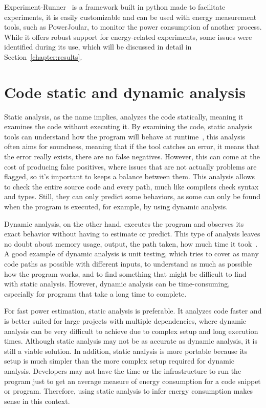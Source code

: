 Experiment-Runner~\cite{S2_Group_Experiment_Runner} is a framework built in python made to facilitate experiments, it is easily customizable and can be used with energy measurement tools, such as PowerJoular, to monitor the power consumption of another process. While it offers robust support for energy-related experiments, some issues were identified during its use, which will be discussed in detail in Section~\ref{chapter:results}.


\section{Code static and dynamic analysis} \label{sec:background_static_dynamic_analysis}

Static analysis, as the name implies, analyzes the code statically, meaning it examines the code without executing it. By examining the code, static analysis tools can understand how the program will behave at runtime~\cite{ernst2003static}, this analysis often aims for soundness, meaning that if the tool catches an error, it means that the error really exists, there are no false negatives. However, this can come at the cost of producing false positives, where issues that are not actually problems are flagged, so it's important to keeps a balance between them. This analysis allows to check the entire source code and every path, much like compilers check syntax and types. Still, they can only predict some behaviors, as some can only be found when the program is executed, for example, by using dynamic analysis.

Dynamic analysis, on the other hand, executes the program and observes its exact behavior without having to estimate or predict. This type of analysis leaves no doubt about memory usage, output, the path taken, how much time it took~\cite{ernst2003static}. A good example of dynamic analysis is unit testing, which tries to cover as many code paths as possible with different inputs, to understand as much as possible how the program works, and to find something that might be difficult to find with static analysis. However, dynamic analysis can be time-consuming, especially for programs that take a long time to complete.

For fast power estimation, static analysis is preferable. It analyzes code faster and is better suited for large projects with multiple dependencies, where dynamic analysis can be very difficult to achieve due to complex setup and long execution times. Although static analysis may not be as accurate as dynamic analysis, it is still a viable solution. In addition, static analysis is more portable because its setup is much simpler than the more complex setup required for dynamic analysis.
Developers may not have the time or the infrastructure to run the program just to get an average measure of energy consumption for a code snippet or program. Therefore, using static analysis to infer energy consumption makes sense in this context.


